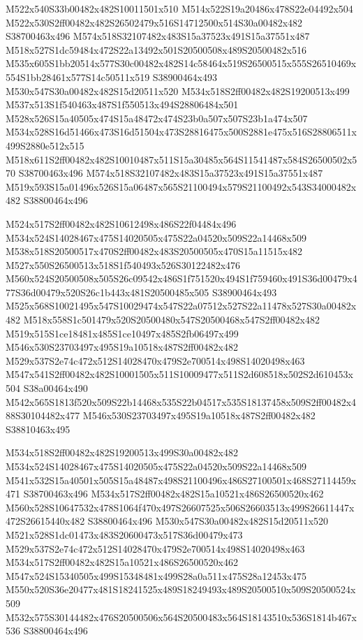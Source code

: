 \documentclass{article}
\begin{document}
\begin{multicols}{2}
M522x540S33b00482x482S10011501x510 M514x522S19a20486x478S22e04492x504 M522x530S2ff00482x482S26502479x516S14712500x514S30a00482x482 S38700463x496 M574x518S32107482x483S15a37523x491S15a37551x487 M518x527S1dc59484x472S22a13492x501S20500508x489S20500482x516 M535x605S1bb20514x577S30c00482x482S14c58464x519S26500515x555S26510469x554S1bb28461x577S14c50511x519 S38900464x493 M530x547S30a00482x482S15d20511x520 M534x518S2ff00482x482S19200513x499 M537x513S1f540463x487S1f550513x494S28806484x501 M528x526S15a40505x474S15a48472x474S23b0a507x507S23b1a474x507 M534x528S16d51466x473S16d51504x473S28816475x500S2881e475x516S28806511x499S2880e512x515 M518x611S2ff00482x482S10010487x511S15a30485x564S11541487x584S26500502x570 S38700463x496 M574x518S32107482x483S15a37523x491S15a37551x487 M519x593S15a01496x526S15a06487x565S21100494x579S21100492x543S34000482x482 S38800464x496

M524x517S2ff00482x482S10612498x486S22f04484x496 M534x524S14028467x475S14020505x475S22a04520x509S22a14468x509 M538x518S20500517x470S2ff00482x483S20500505x470S15a11515x482 M527x550S26500513x518S1f540493x526S30122482x476 M560x524S20500508x505S26c09542x486S1f751520x494S1f759460x491S36d00479x477S36d00479x520S26c1b443x481S20500485x505 S38900464x493 M525x568S10021495x547S10029474x547S22a07512x527S22a11478x527S30a00482x482 M518x558S1c501479x520S20500480x547S20500468x547S2ff00482x482 M519x515S1ce18481x485S1ce10497x485S2fb06497x499 M546x530S23703497x495S19a10518x487S2ff00482x482 M529x537S2e74c472x512S14028470x479S2e700514x498S14020498x463 M547x541S2ff00482x482S10001505x511S10009477x511S2d608518x502S2d610453x504 S38a00464x490 M542x565S1813f520x509S22b14468x535S22b04517x535S18137458x509S2ff00482x488S30104482x477 M546x530S23703497x495S19a10518x487S2ff00482x482 S38810463x495

M534x518S2ff00482x482S19200513x499S30a00482x482 M534x524S14028467x475S14020505x475S22a04520x509S22a14468x509 M541x532S15a40501x505S15a48487x498S21100496x486S27100501x468S27114459x471 S38700463x496 M534x517S2ff00482x482S15a10521x486S26500520x462 M560x528S10647532x478S1064f470x497S26607525x506S26603513x499S26611447x472S26615440x482 S38800464x496 M530x547S30a00482x482S15d20511x520 M521x528S1dc01473x483S20600473x517S36d00479x473 M529x537S2e74c472x512S14028470x479S2e700514x498S14020498x463 M534x517S2ff00482x482S15a10521x486S26500520x462 M547x524S15340505x499S15348481x499S28a0a511x475S28a12453x475 M550x520S36e20477x481S18241525x489S18249493x489S20500510x509S20500524x509 M532x575S30144482x476S20500506x564S20500483x564S18143510x536S1814b467x536 S38800464x496


\end{multicols}
\end{document}
